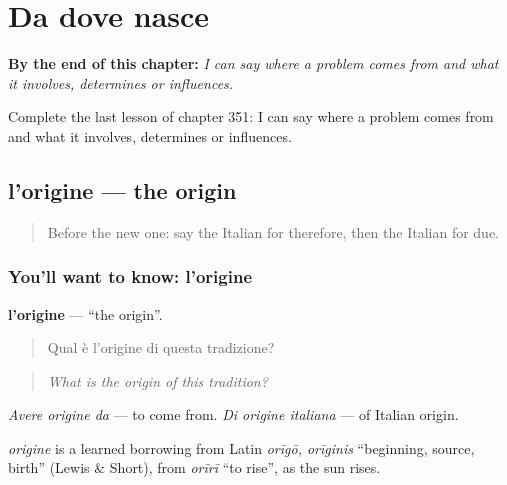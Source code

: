 
\chapter{Da dove nasce}
\label{ch:it-da-dove-nasce}

\begin{chapteropening}
\textbf{By the end of this chapter:} \emph{I can say where a problem comes from and what it involves, determines or influences.}

Complete the last lesson of chapter 351: I can say where a problem comes from and what it involves, determines or influences.
\end{chapteropening}

\section[l'origine]{l'origine — the origin}

\label{lesson:IT-C351-origine}



\begin{quote}
Before the new one: say the Italian for therefore, then the Italian for due.
\end{quote}

\subsection*{You'll want to know: l'origine}
\textbf{l'origine} — \textquotedblleft{}the origin\textquotedblright{}.

\begin{quote}
Qual è l'origine di questa tradizione?
\end{quote}

\begin{quote}
\emph{What is the origin of this tradition?}
\end{quote}

\emph{Avere origine da} — to come from. \emph{Di origine italiana} — of Italian origin.

\begin{cousinweb}
\emph{origine} is a learned borrowing from Latin \emph{orīgō, orīginis} \textquotedblleft{}beginning, source, birth\textquotedblright{} (Lewis \& Short), from \emph{orīrī} \textquotedblleft{}to rise\textquotedblright{}, as the sun rises.
\end{cousinweb}

